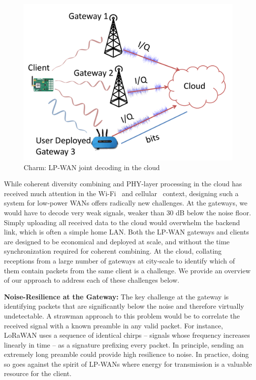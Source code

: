 \begin{figure}
    \centering
    \includegraphics[width=0.60\columnwidth]{figures/LoRaRAN.pdf}
        \vspace*{-0.1in}
    \caption{Charm: LP-WAN joint decoding in the cloud}
    \vspace*{-0.1in}
    \label{fig:my_label}
    \compactimg
\end{figure}

While coherent diversity combining and PHY-layer processing in the cloud has
received much attention in the Wi-Fi~\cite{tan2009sam, xie2014scalable} and
cellular~\cite{checko2015cloud, wubben2014benefits} context, designing such a
system for low-power WANs offers radically new challenges. At the gateways, we
would have to decode very weak signals, weaker than 30 dB below the noise
floor. Simply uploading all received data to the cloud would overwhelm
the backend link, which is often  a simple home LAN. Both the LP-WAN gateways
and clients are designed to be economical and deployed at scale, and without
the time synchronization required for coherent combining. At the cloud,
collating receptions from a large number of gateways at city-scale to identify
which of them contain packets from the same client is a challenge. We provide
an overview of our approach to address each of these challenges below.

\noindent \textbf{Noise-Resilience at the Gateway:} The key challenge at the
gateway is identifying packets that are significantly below the noise and
therefore virtually undetectable. A strawman approach to this problem would be
to correlate the received signal with a known preamble in any valid packet.
For instance, LoRaWAN uses a sequence of identical chirps -- signals whose
frequency increases linearly in time -- as a signature prefixing every packet.
In principle, sending an extremely long preamble could provide high resilience
to noise. In practice, doing so goes against the spirit of LP-WANs where
energy for transmission is a valuable resource for the client.

